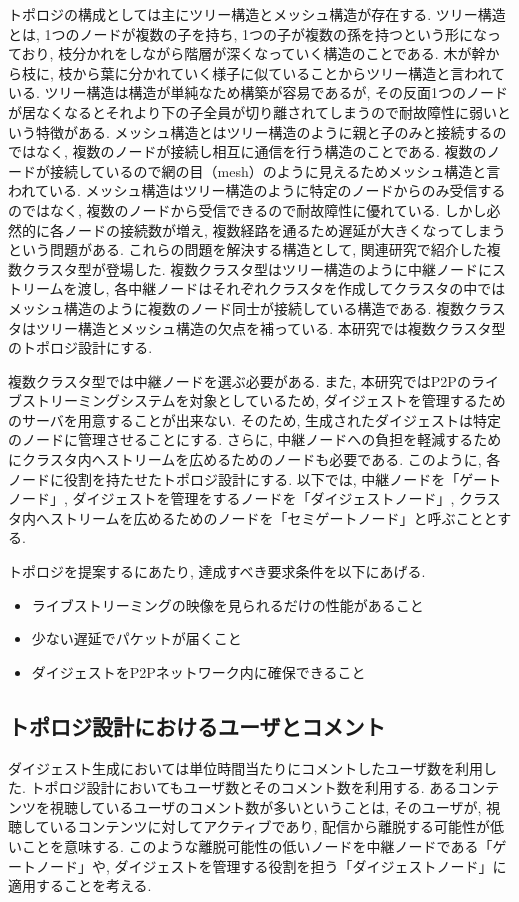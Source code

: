 トポロジの構成としては主にツリー構造とメッシュ構造が存在する. ツリー構造とは, 1つのノードが複数の子を持ち, 1つの子が複数の孫を持つという形になっており, 枝分かれをしながら階層が深くなっていく構造のことである. 木が幹から枝に, 枝から葉に分かれていく様子に似ていることからツリー構造と言われている. ツリー構造は構造が単純なため構築が容易であるが, その反面1つのノードが居なくなるとそれより下の子全員が切り離されてしまうので耐故障性に弱いという特徴がある. メッシュ構造とはツリー構造のように親と子のみと接続するのではなく, 複数のノードが接続し相互に通信を行う構造のことである. 複数のノードが接続しているので網の目（mesh）のように見えるためメッシュ構造と言われている. メッシュ構造はツリー構造のように特定のノードからのみ受信するのではなく, 複数のノードから受信できるので耐故障性に優れている. しかし必然的に各ノードの接続数が増え, 複数経路を通るため遅延が大きくなってしまうという問題がある. これらの問題を解決する構造として, 関連研究で紹介した複数クラスタ型が登場した. 複数クラスタ型はツリー構造のように中継ノードにストリームを渡し, 各中継ノードはそれぞれクラスタを作成してクラスタの中ではメッシュ構造のように複数のノード同士が接続している構造である. 複数クラスタはツリー構造とメッシュ構造の欠点を補っている. 本研究では複数クラスタ型のトポロジ設計にする.

複数クラスタ型では中継ノードを選ぶ必要がある. また, 本研究ではP2Pのライブストリーミングシステムを対象としているため, ダイジェストを管理するためのサーバを用意することが出来ない. そのため, 生成されたダイジェストは特定のノードに管理させることにする. さらに, 中継ノードへの負担を軽減するためにクラスタ内へストリームを広めるためのノードも必要である. このように, 各ノードに役割を持たせたトポロジ設計にする. 以下では, 中継ノードを「ゲートノード」, ダイジェストを管理をするノードを「ダイジェストノード」, クラスタ内へストリームを広めるためのノードを「セミゲートノード」と呼ぶこととする.

トポロジを提案するにあたり, 達成すべき要求条件を以下にあげる.

\begin{itemize}
\item ライブストリーミングの映像を見られるだけの性能があること
\item 少ない遅延でパケットが届くこと
\item ダイジェストをP2Pネットワーク内に確保できること
\end{itemize}

\subsection{トポロジ設計におけるユーザとコメント}
ダイジェスト生成においては単位時間当たりにコメントしたユーザ数を利用した. トポロジ設計においてもユーザ数とそのコメント数を利用する. あるコンテンツを視聴しているユーザのコメント数が多いということは, そのユーザが, 視聴しているコンテンツに対してアクティブであり, 配信から離脱する可能性が低いことを意味する. このような離脱可能性の低いノードを中継ノードである「ゲートノード」や, ダイジェストを管理する役割を担う「ダイジェストノード」に適用することを考える.

